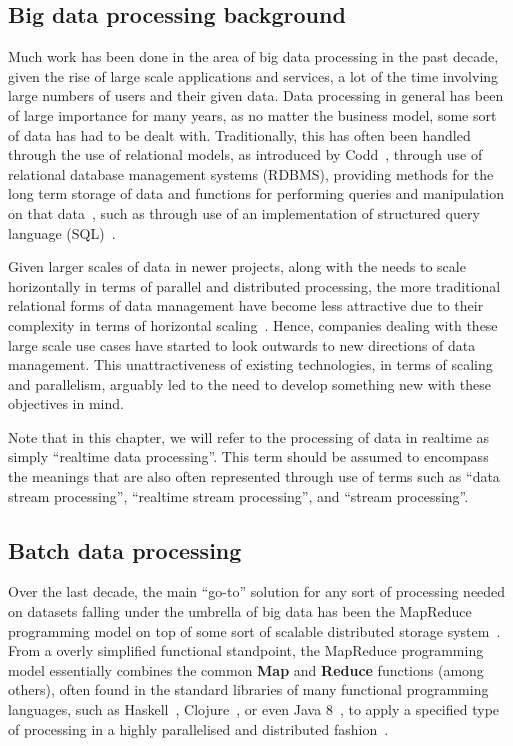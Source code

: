 

\subsection{Big data processing background} %
\label{sec:big_data_processing_background}

Much work has been done in the area of big data processing in the past decade, given the rise of large
scale applications and services, a lot of the time involving large numbers of users and their given data.
Data processing in general has been of large importance for many years, as no matter the business model,
some sort of data has had to be dealt with. Traditionally, this has often been handled through the use of
relational models, as introduced by Codd~\cite{codd1970relational}, through use of relational database
management systems (RDBMS), providing methods for the long term storage of
data and functions for performing queries and manipulation on that data~\cite{astrahan1976system},
such as through use of an implementation of structured query language (SQL)~\cite{chamberlin1974sequel}.

Given larger scales of data in newer projects, along with the needs to scale horizontally in terms of
parallel and distributed processing, the more traditional relational forms of data management have become
less attractive due to their complexity in terms of horizontal scaling~\cite{agrawal2011big}. Hence,
companies dealing with these large scale use cases have started to look outwards to new directions of
data management. This unattractiveness of existing technologies, in terms of scaling and parallelism,
arguably led to the need to develop something new with these objectives in mind.

Note that in this chapter, we will refer to the processing of data in realtime as simply ``realtime data
processing''. This term should be assumed to encompass the meanings that are also often represented through
use of terms such as ``data stream processing'', ``realtime stream processing'', and ``stream processing''.


\subsection{Batch data processing} %
\label{sub:batch_data_processing}

Over the last decade, the main ``go-to'' solution for any sort of processing needed on datasets falling under
the umbrella of big data has been the MapReduce programming model on top of some sort of scalable distributed
storage system~\cite{bifet_mining_2013}. From a overly simplified functional standpoint, the MapReduce
programming model essentially combines the common \textbf{Map} and \textbf{Reduce} functions (among others),
often found in the standard libraries of many functional programming languages, such as
Haskell~\cite{lammel2008google}, Clojure~\cite{hickey2008clojure}, or even Java 8~\cite{su2014changing}, to
apply a specified type of processing in a highly parallelised and distributed fashion~\cite{yang2007map}.

